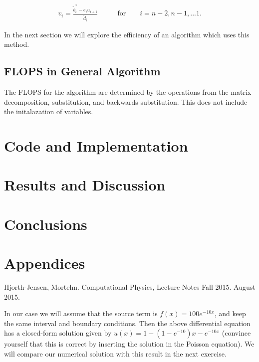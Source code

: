 \documentclass[%
oneside,                 %
final,                   %
10pt]{article}
\begin{document}
\begin{align*}
v_i=\frac{\tilde{b}^*_i - e_i u_{i+1}}{\tilde{d}_i} &\qquad\text{for}\qquad i=n-2,n-1,...1.
\end{align*}

In the next section we will explore the efficiency of an algorithm which uses this method.

\subsection{FLOPS in General Algorithm}

The FLOPS for the algorithm are determined by the operations from the matrix decomposition, substitution, and backwards substitution.  This does not include the initalazation of variables.

\section{Code and Implementation}

\section{Results and Discussion}

\section{Conclusions}

\section{Appendices}

\begin{thebibliography}{9}

Hjorth-Jensen, Mortehn. 
Computational Physics, Lecture Notes Fall 2015. 
August 2015.
 
\end{thebibliography}



In our case we will assume  that the source term is 
$f(x) = 100e^{-10x}$, and keep the same interval and boundary 
conditions. Then the above differential equation
has a closed-form  solution given by $u(x) = 1-(1-e^{-10})x-e^{-10x}$ (convince yourself that this is correct by inserting the
solution in the Poisson equation).  We will compare
our numerical solution with this result in the next exercise. 
\end{document}
